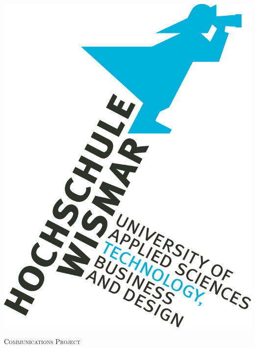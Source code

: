\documentclass[12pt]{article}
\begin{document}
\begin{titlepage}

\newcommand{\HRule}{\rule{\linewidth}{0.5mm}} %

\center %


\noindent\begin{minipage}[t][0.3819660112501052\paperheight][t]{\textwidth}
\centering
\vspace{0.09016994374947421\paperheight}
\includegraphics[scale=0.382]{logo.jpg}
\end{minipage}

\textsc{\Large Communications Project}\\[0.5cm] %


\end{titlepage}
\end{document}
